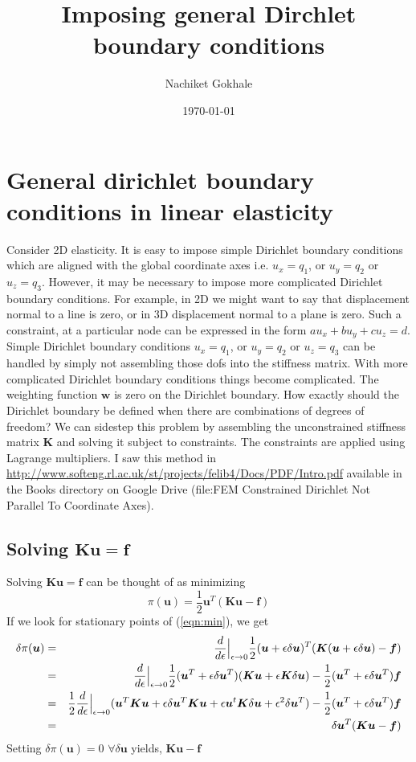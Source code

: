 \documentclass{article}
\newcommand{\beq}{\begin{equation}}
\newcommand{\eeq}{\end{equation}}
\newcommand{\ber}{\begin{eqnarray}}
\newcommand{\eer}{\end{eqnarray}}
\newcommand{\ddeps}{\frac{d}{d{\epsilon}}\Big{|}_{\epsilon\rightarrow{0}}}
\newcommand{\eps}{\epsilon}
\newcommand{\nn}{\nonumber}
\begin{document}
\title{Imposing general Dirchlet boundary conditions}
\author{Nachiket Gokhale}
\date{\today}
\maketitle
\section{General dirichlet boundary conditions in linear elasticity}
Consider 2D elasticity. It is easy to impose simple Dirichlet boundary conditions which are aligned with the global coordinate axes i.e. $u_x=q_1$, or $u_y=q_2$ or $u_z=q_3$. However, it may be necessary to impose more complicated Dirichlet boundary conditions. For example, in 2D we might want to say that displacement normal to a line is zero, or in 3D displacement normal to a plane is zero. Such a constraint, at a particular node can be expressed in the form $au_x + bu_y + cu_z=d$. Simple Dirichlet boundary conditions $u_x=q_1$, or $u_y=q_2$ or $u_z=q_3$ can be handled by simply not assembling those dofs into the stiffness matrix. With more complicated Dirichlet boundary conditions things become complicated. The weighting function $\bm{w}$ is zero on the Dirichlet boundary. How exactly should the Dirichlet boundary be defined when there are combinations of degrees of freedom? We can sidestep this problem by assembling the unconstrained stiffness matrix $\bm{K}$ and solving it subject to constraints. The constraints are applied using Lagrange multipliers. I saw this method in \url{http://www.softeng.rl.ac.uk/st/projects/felib4/Docs/PDF/Intro.pdf} available in the Books directory on Google Drive (file:FEM Constrained Dirichlet Not Parallel To Coordinate Axes).
\subsection{Solving $\bm{Ku}=\bm{f}$}
Solving $\bm{Ku}=\bm{f}$ can be thought of as minimizing
\beq
\label{eqn:min}
\pi(\bm{u}) = \frac{1}{2}\bm{u}^T(\bm{Ku}-\bm{f})
\eeq
If we look for stationary points of (\ref{eqn:min}), we get
\ber
\delta\pi(\bm{u}) &=& \ddeps  \frac{1}{2}(\bm{u}+\eps\delta\bm{u})^T(\bm{K}{(\bm{u}+\eps\delta\bm{u})}-\bm{f}) \nn \\
&=& \ddeps  \frac{1}{2}(\bm{u}^T + \eps\delta\bm{u}^T)(\bm{K}\bm{u}+\eps\bm{K}\delta\bm{u}) - \frac{1}{2}(\bm{u}^T + \eps\delta\bm{u}^T)\bm{f} \nn \\
&=& \frac{1}{2}\ddeps (\bm{u}^T\bm{K}\bm{u} + \eps\delta\bm{u}^T\bm{Ku} + \eps\bm{u}^t\bm{K}\delta\bm{u} + \eps^2\delta\bm{u}^T)  - \frac{1}{2}(\bm{u}^T + \eps\delta\bm{u}^T)\bm{f} \nn \\
&=& \delta\bm{u}^T(\bm{Ku}-\bm{f})
\eer
Setting $\delta\pi(\bm{u}) = 0\,\,\forall{\delta\bm{u}}$ yields, $\bm{Ku}-\bm{f}$
\end{document}
